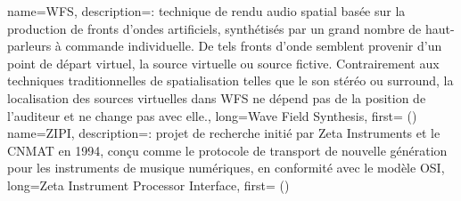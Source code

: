 {
    name={WFS},
    description={\textit{}: technique de rendu audio spatial basée sur la production de fronts d'ondes artificiels, synthétisés par un grand nombre de haut-parleurs à commande individuelle. De tels fronts d'onde semblent provenir d'un point de départ virtuel, la source virtuelle ou source fictive. Contrairement aux techniques traditionnelles de spatialisation telles que le son stéréo ou surround, la localisation des sources virtuelles dans WFS ne dépend pas de la position de l'auditeur et ne change pas avec elle.},
    long={Wave Field Synthesis},
    first={ ()}
}
{
    name={ZIPI},
    description={\textit{}: projet de recherche initié par Zeta Instruments et le \gls{CNMAT} en 1994, conçu comme le protocole de transport de nouvelle génération pour les instruments de musique numériques, en conformité avec le modèle \gls{OSI}},
    long={Zeta Instrument Processor Interface},
    first={ ()}
}


%

